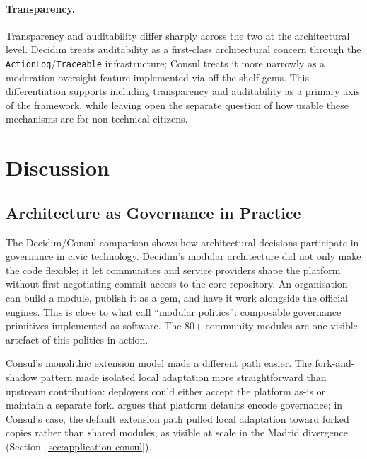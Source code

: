 \documentclass[11pt,a4paper]{article}
\begin{document}
\paragraph{Transparency.}
Transparency and auditability differ sharply across the two at the architectural level. Decidim treats auditability as a first-class architectural concern through the \texttt{ActionLog}/\texttt{Traceable} infrastructure; Consul treats it more narrowly as a moderation oversight feature implemented via off-the-shelf gems. This differentiation supports including transparency and auditability as a primary axis of the framework, while leaving open the separate question of how usable these mechanisms are for non-technical citizens.
\FloatBarrier

\section{Discussion}\label{sec:discussion}

\subsection{Architecture as Governance in Practice}\label{sec:disc-gov}

The Decidim/Consul comparison shows how architectural decisions participate in governance in civic technology. Decidim's modular architecture did not only make the code flexible; it let communities and service providers shape the platform without first negotiating commit access to the core repository. An organisation can build a module, publish it as a gem, and have it work alongside the official engines. This is close to what \citet{schneider2021modular} call ``modular politics'': composable governance primitives implemented as software. The 80+ community modules are one visible artefact of this politics in action.

Consul's monolithic extension model made a different path easier. The fork-and-shadow pattern made isolated local adaptation more straightforward than upstream contribution: deployers could either accept the platform as-is or maintain a separate fork. \citet{schneider2024governable} argues that platform defaults encode governance; in Consul's case, the default extension path pulled local adaptation toward forked copies rather than shared modules, as visible at scale in the Madrid divergence (Section~\ref{sec:application-consul}).
\end{document}
